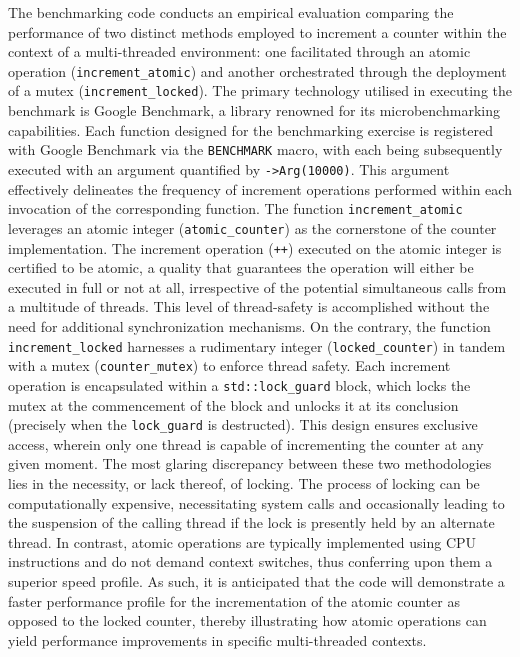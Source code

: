 \documentclass{article}
\theoremstyle{break}
\begin{document}
The benchmarking code conducts an empirical evaluation comparing the performance of two distinct methods employed to increment a counter within the context of a multi-threaded environment: one facilitated through an atomic operation (\texttt{increment\_atomic}) and another orchestrated through the deployment of a mutex (\texttt{increment\_locked}). The primary technology utilised in executing the benchmark is Google Benchmark, a library renowned for its microbenchmarking capabilities. Each function designed for the benchmarking exercise is registered with Google Benchmark via the \texttt{BENCHMARK} macro, with each being subsequently executed with an argument quantified by \texttt{->Arg(10000)}. This argument effectively delineates the frequency of increment operations performed within each invocation of the corresponding function. The function \texttt{increment\_atomic} leverages an atomic integer (\texttt{atomic\_counter}) as the cornerstone of the counter implementation. The increment operation (\texttt{++}) executed on the atomic integer is certified to be atomic, a quality that guarantees the operation will either be executed in full or not at all, irrespective of the potential simultaneous calls from a multitude of threads. This level of thread-safety is accomplished without the need for additional synchronization mechanisms. On the contrary, the function \texttt{increment\_locked} harnesses a rudimentary integer (\texttt{locked\_counter}) in tandem with a mutex (\texttt{counter\_mutex}) to enforce thread safety. Each increment operation is encapsulated within a \texttt{std::lock\_guard} block, which locks the mutex at the commencement of the block and unlocks it at its conclusion (precisely when the \texttt{lock\_guard} is destructed). This design ensures exclusive access, wherein only one thread is capable of incrementing the counter at any given moment. The most glaring discrepancy between these two methodologies lies in the necessity, or lack thereof, of locking. The process of locking can be computationally expensive, necessitating system calls and occasionally leading to the suspension of the calling thread if the lock is presently held by an alternate thread. In contrast, atomic operations are typically implemented using CPU instructions and do not demand context switches, thus conferring upon them a superior speed profile. As such, it is anticipated that the code will demonstrate a faster performance profile for the incrementation of the atomic counter as opposed to the locked counter, thereby illustrating how atomic operations can yield performance improvements in specific multi-threaded contexts.
\end{document}
